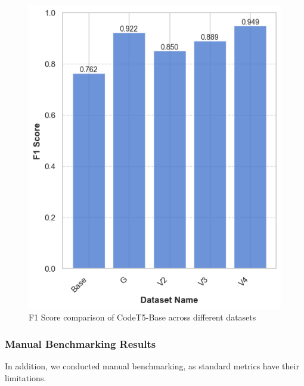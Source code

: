 \documentclass[conference]{IEEEtran}
\begin{document}
\begin{figure}[htbp]
\centerline{\includegraphics[width=\columnwidth]{images/t5_base.png}}
\caption{F1 Score comparison of CodeT5-Base across different datasets}
\label{base}
\end{figure}

\subsubsection{Manual Benchmarking Results}
In addition, we conducted manual benchmarking, as standard metrics have their limitations. 
\end{document}
